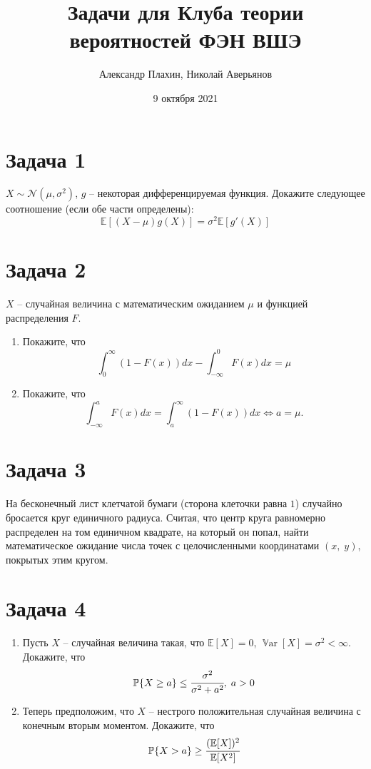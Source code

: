 \documentclass[a4paper, 12pt]{article}
\title{Задачи для Клуба теории вероятностей ФЭН ВШЭ}
\author{Александр Плахин, Николай Аверьянов}
\date{9 октября 2021}
\newcommand{\E}{\mathbb{E}}
\renewcommand{\P}{\mathbb{P}}
\DeclareMathOperator{\Var}{\mathbb{V}ar}
\begin{document}
\maketitle

\section*{Задача 1}
$X \sim \mathcal{N}(\mu, \sigma^2)$, $g$ -- некоторая дифференцируемая функция. Докажите следующее соотношение (если обе части определены):
$$
\E[(X-\mu)g(X)] = \sigma^2\E[g'(X)]
$$


\section*{Задача 2}

$X$ -- случайная величина с математическим ожиданием $\mu$ и функцией распределения $F$.
\begin{enumerate}
    \item Покажите, что
    $$
    \int_0^{\infty} (1-F(x))dx - \int_{-\infty}^0 F(x)dx = \mu
    $$
\item Покажите, что 
$$
\int_{-\infty}^a F(x)dx = \int_a^{\infty} (1-F(x))dx \iff a = \mu.
$$

\end{enumerate}

\section*{Задача 3}
На бесконечный лист клетчатой бумаги (сторона клеточки равна $1$) случайно бросается круг единичного радиуса. Считая, что центр круга равномерно распределен на том единичном квадрате, на который он попал, найти математическое ожидание числа точек с целочисленными координатами $(x, \; y)$, покрытых этим кругом.


\section*{Задача 4}

\begin{enumerate}
    \item Пусть $X$ -- случайная величина такая, что $\E[X] = 0$, $\Var[X] = \sigma^2 < \infty$. Докажите, что 
    $$
    \P\{X \geq a\} \leq \cfrac{\sigma^2}{\sigma^2 + a^2}, \; a > 0
    $$
    \item Теперь предположим, что $X$ -- нестрого положительная случайная величина с конечным вторым моментом. Докажите, что
    $$
    \P\{X > a\} \geq \cfrac{(\E[X])^2}{\E[X^2]}
    $$
\end{enumerate}
\end{document}

